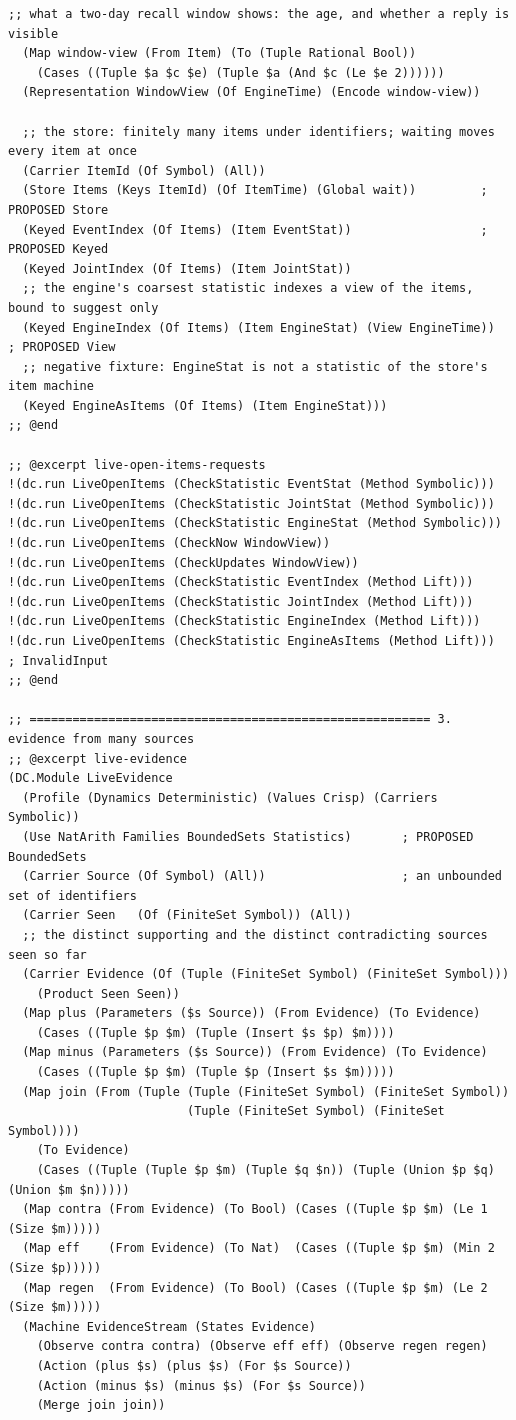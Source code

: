 \documentclass[11pt]{article}
\theoremstyle{definition}
\theoremstyle{plain}
\begin{document}
\begin{lstlisting}[style=mettafull]
  ;; what a two-day recall window shows: the age, and whether a reply is visible
  (Map window-view (From Item) (To (Tuple Rational Bool))
    (Cases ((Tuple $a $c $e) (Tuple $a (And $c (Le $e 2))))))
  (Representation WindowView (Of EngineTime) (Encode window-view))

  ;; the store: finitely many items under identifiers; waiting moves every item at once
  (Carrier ItemId (Of Symbol) (All))
  (Store Items (Keys ItemId) (Of ItemTime) (Global wait))         ; PROPOSED Store
  (Keyed EventIndex (Of Items) (Item EventStat))                  ; PROPOSED Keyed
  (Keyed JointIndex (Of Items) (Item JointStat))
  ;; the engine's coarsest statistic indexes a view of the items, bound to suggest only
  (Keyed EngineIndex (Of Items) (Item EngineStat) (View EngineTime))   ; PROPOSED View
  ;; negative fixture: EngineStat is not a statistic of the store's item machine
  (Keyed EngineAsItems (Of Items) (Item EngineStat)))
;; @end

;; @excerpt live-open-items-requests
!(dc.run LiveOpenItems (CheckStatistic EventStat (Method Symbolic)))
!(dc.run LiveOpenItems (CheckStatistic JointStat (Method Symbolic)))
!(dc.run LiveOpenItems (CheckStatistic EngineStat (Method Symbolic)))
!(dc.run LiveOpenItems (CheckNow WindowView))
!(dc.run LiveOpenItems (CheckUpdates WindowView))
!(dc.run LiveOpenItems (CheckStatistic EventIndex (Method Lift)))
!(dc.run LiveOpenItems (CheckStatistic JointIndex (Method Lift)))
!(dc.run LiveOpenItems (CheckStatistic EngineIndex (Method Lift)))
!(dc.run LiveOpenItems (CheckStatistic EngineAsItems (Method Lift)))   ; InvalidInput
;; @end

;; ======================================================== 3. evidence from many sources
;; @excerpt live-evidence
(DC.Module LiveEvidence
  (Profile (Dynamics Deterministic) (Values Crisp) (Carriers Symbolic))
  (Use NatArith Families BoundedSets Statistics)       ; PROPOSED BoundedSets
  (Carrier Source (Of Symbol) (All))                   ; an unbounded set of identifiers
  (Carrier Seen   (Of (FiniteSet Symbol)) (All))
  ;; the distinct supporting and the distinct contradicting sources seen so far
  (Carrier Evidence (Of (Tuple (FiniteSet Symbol) (FiniteSet Symbol)))
    (Product Seen Seen))
  (Map plus (Parameters ($s Source)) (From Evidence) (To Evidence)
    (Cases ((Tuple $p $m) (Tuple (Insert $s $p) $m))))
  (Map minus (Parameters ($s Source)) (From Evidence) (To Evidence)
    (Cases ((Tuple $p $m) (Tuple $p (Insert $s $m)))))
  (Map join (From (Tuple (Tuple (FiniteSet Symbol) (FiniteSet Symbol))
                         (Tuple (FiniteSet Symbol) (FiniteSet Symbol))))
    (To Evidence)
    (Cases ((Tuple (Tuple $p $m) (Tuple $q $n)) (Tuple (Union $p $q) (Union $m $n)))))
  (Map contra (From Evidence) (To Bool) (Cases ((Tuple $p $m) (Le 1 (Size $m)))))
  (Map eff    (From Evidence) (To Nat)  (Cases ((Tuple $p $m) (Min 2 (Size $p)))))
  (Map regen  (From Evidence) (To Bool) (Cases ((Tuple $p $m) (Le 2 (Size $m)))))
  (Machine EvidenceStream (States Evidence)
    (Observe contra contra) (Observe eff eff) (Observe regen regen)
    (Action (plus $s) (plus $s) (For $s Source))
    (Action (minus $s) (minus $s) (For $s Source))
    (Merge join join))


\end{lstlisting}
\end{document}
